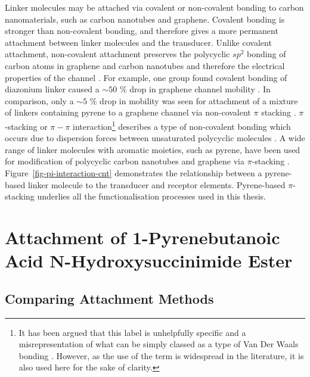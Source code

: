 \documentclass[
  a4paper,
]{scrbook}
\begin{document}
Linker molecules may be attached via covalent or non-covalent bonding to
carbon nanomaterials, such as carbon nanotubes and graphene. Covalent
bonding is stronger than non-covalent bonding, and therefore gives a
more permanent attachment between linker molecules and the transducer.
Unlike covalent attachment, non-covalent attachment preserves the
polycyclic \(sp^2\) bonding of carbon atoms in graphene and carbon
nanotubes and therefore the electrical properties of the channel
\autocite{DiCrescenzo2014,Yao2021,Shkodra2021,Li2023}. For example, one
group found covalent bonding of diazonium linker caused a \(\sim 50\) \%
drop in graphene channel mobility \autocite{Lerner2014}. In comparison,
only a \(\sim 5\) \% drop in mobility was seen for attachment of a
mixture of linkers containing pyrene to a graphene channel via
non-covalent \(\pi\) stacking \autocite{Thodkar2021}. \(\pi\)-stacking
or \(\pi-\pi\) interaction\footnote{It has been argued that this label
  is unhelpfully specific and a misrepresentation of what can be simply
  classed as a type of Van Der Waals bonding
  \autocite{Martinez2012,Perez2015}. However, as the use of the term is
  widespread in the literature, it is also used here for the sake of
  clarity.} describes a type of non-covalent bonding which occurs due to
dispersion forces between unsaturated polycyclic molecules
\autocite{Perez2015}. A wide range of linker molecules with aromatic
moieties, such as pyrene, have been used for modification of polycyclic
carbon nanotubes and graphene via \(\pi\)-stacking
\autocite{Hermanson2013-16,Perez2015,Zhou2019,Mishyn2022}.
Figure~\ref{fig-pi-interaction-cnt} demonstrates the relationship
between a pyrene-based linker molecule to the transducer and receptor
elements. Pyrene-based \(\pi\)-stacking underlies all the
functionalisation processes used in this thesis.

\hypertarget{sec-PBASE}{%
\section{Attachment of 1-Pyrenebutanoic Acid N-Hydroxysuccinimide
Ester}\label{sec-PBASE}}

\hypertarget{sec-PBASE-attachment}{%
\subsection{Comparing Attachment Methods}\label{sec-PBASE-attachment}}
\end{document}
